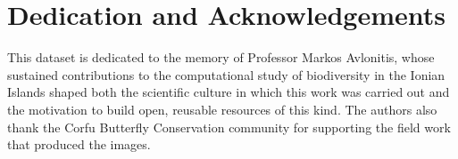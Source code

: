 \documentclass[11pt,a4paper]{article}
\begin{document}
\section*{Dedication and Acknowledgements}
This dataset is dedicated to the memory of Professor Markos Avlonitis, whose sustained contributions to the
computational study of biodiversity in the Ionian Islands shaped
both the scientific culture in which this work was carried out and
the motivation to build open, reusable resources of this kind. The
authors also thank the Corfu Butterfly Conservation community for
supporting the field work that produced the images.

\clearpage


\end{document}
